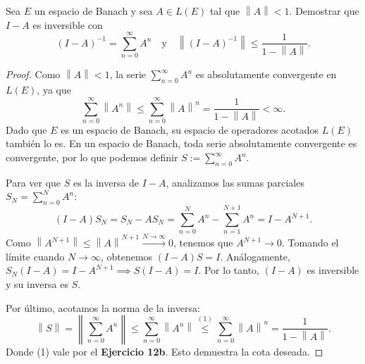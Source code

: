 \documentclass{article}
\theoremstyle{definition}
\newcommand{\norm}[1]{\left\lVert #1 \right\rVert}       %
\newenvironment{ejercicio}[1]{\begin{trivlist}
\item[\hskip \labelsep {\bfseries Ejercicio}\hskip \labelsep {\bfseries #1.}]}{\end{trivlist}}
\begin{document}
\begin{ejercicio}{13}
    Sea \(E\) un espacio de Banach y sea \(A \in L(E)\) tal que \(\norm{A} < 1\). Demostrar que \(I-A\) es inversible con
    \[
        {(I-A)}^{-1} = \sum_{n=0}^{\infty} A^n \quad \text{y} \quad \norm{{(I-A)}^{-1}} \leq \frac{1}{1-\norm{A}}.
    \]
\end{ejercicio}
\begin{proof}
    Como \(\norm{A} < 1\), la serie \(\sum_{n=0}^{\infty} A^n\) es absolutamente convergente en \(L(E)\), ya que
    \[
        \sum_{n=0}^{\infty} \norm{A^n} \leq \sum_{n=0}^{\infty} \norm{A}^n = \frac{1}{1-\norm{A}} < \infty.
    \]
    Dado que \(E\) es un espacio de Banach, su espacio de operadores acotados \(L(E)\) también lo es. En un espacio de Banach, toda serie absolutamente convergente es convergente, por lo que podemos definir \(S := \sum_{n=0}^{\infty} A^n\).

    Para ver que \(S\) es la inversa de \(I-A\), analizamos las sumas parciales \(S_N = \sum_{n=0}^{N} A^n\):
    \[
        (I-A)S_N = S_N - A S_N = \sum_{n=0}^{N} A^n - \sum_{n=1}^{N+1} A^n = I - A^{N+1}.
    \]
    Como \( \norm{A^{N+1}} \leq \norm{A}^{N+1} \xrightarrow{N \to \infty} 0\), tenemos que \(A^{N+1} \to 0\). Tomando el límite cuando \(N \to \infty \), obtenemos \((I-A)S = I\). Análogamente, \(S_N(I-A) = I - A^{N+1} \implies S(I-A) = I\). Por lo tanto, \((I-A)\) es inversible y su inversa es \(S\).

    Por último, acotamos la norma de la inversa:
    \[
        \norm{S} = \norm{ \sum_{n=0}^{\infty} A^n } \leq \sum_{n=0}^{\infty} \norm{A^n} \overset{(1)}{\leq} \sum_{n=0}^{\infty} \norm{A}^n = \frac{1}{1-\norm{A}}.
    \]
    Donde (1) vale por el \textbf{Ejercicio 12b}. Esto demuestra la cota deseada.
\end{proof}
\end{document}
